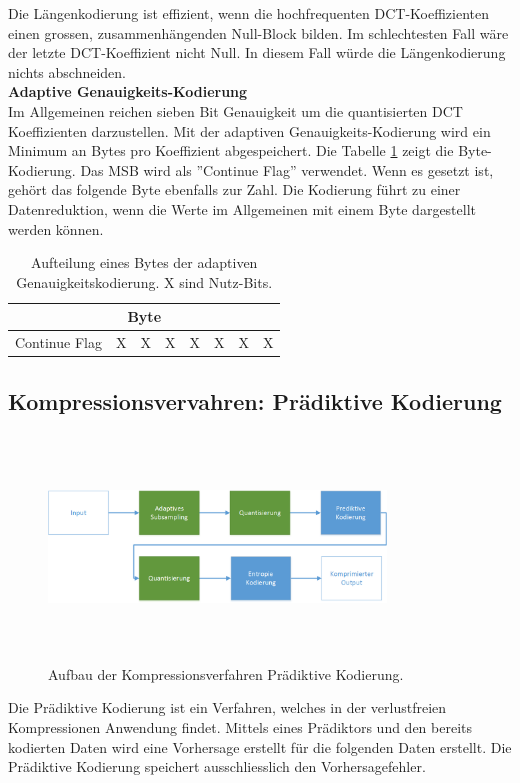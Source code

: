 Die Längenkodierung ist effizient, wenn die hochfrequenten DCT-Koeffizienten einen grossen, zusammenhängenden Null-Block bilden. Im schlechtesten Fall wäre der letzte DCT-Koeffizient nicht Null. In diesem Fall würde die Längenkodierung nichts abschneiden.\\

\textbf{Adaptive Genauigkeits-Kodierung}\\
Im Allgemeinen reichen sieben Bit Genauigkeit um die quantisierten DCT Koeffizienten darzustellen. Mit der adaptiven Genauigkeits-Kodierung wird ein Minimum an Bytes pro Koeffizient abgespeichert. Die Tabelle \ref{konzept:loesung1:entropie:adaptive} zeigt die Byte-Kodierung. Das MSB wird als ''Continue Flag'' verwendet. Wenn es gesetzt ist, gehört das folgende Byte ebenfalls zur Zahl. Die Kodierung führt zu einer Datenreduktion, wenn die Werte im Allgemeinen mit einem Byte dargestellt werden können.

\begin{table}[!htbp]
	\center
	\begin{tabular}{|c|c|c|c||c|c|c|c|}
	\hline
	\multicolumn{8}{|c|}{Byte}\\\hline
	Continue Flag & X & X & X & X & X & X & X \\\hline
	\end{tabular}
	\caption{Aufteilung eines Bytes der adaptiven Genauigkeitskodierung. X sind Nutz-Bits.}
	\label{konzept:loesung1:entropie:adaptive}
\end{table}
\pagebreak

\subsection{Kompressionsvervahren: Prädiktive Kodierung} \label{konzept:prediktiv}
\begin{figure}[!htbp]
	\center
	\includegraphics[width=0.8\textwidth,height=6cm,keepaspectratio]{./pictures/konzept/solution2/aufbau.png}
	\caption{Aufbau der Kompressionsverfahren Prädiktive Kodierung.}
	\label{konzept:loesung2:aufbau}
\end{figure}
Die Prädiktive Kodierung ist ein Verfahren, welches in der verlustfreien Kompressionen Anwendung findet. Mittels eines Prädiktors und den bereits kodierten Daten wird eine Vorhersage erstellt für die folgenden Daten erstellt. Die Prädiktive Kodierung speichert ausschliesslich den Vorhersagefehler.

